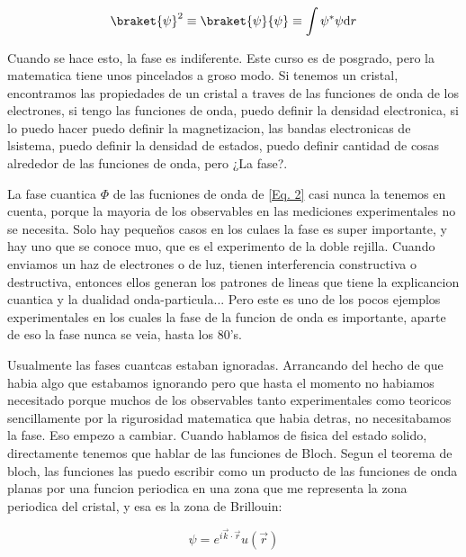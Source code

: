 \documentclass[11pt,fleqn]{book}
\begin{document}
\begin{equation}
    \braket{\psi}^{2}\equiv \braket{\psi}{\psi}\equiv\int\psi^{*}\psi\mathrm{d}r
    \label{Eq. 2}
\end{equation}

Cuando se hace esto, la fase es indiferente. Este curso es de posgrado, pero la matematica tiene unos pincelados a groso modo. Si tenemos un cristal, encontramos las propiedades de un cristal a traves de las funciones de onda de los electrones, si tengo las funciones de onda, puedo definir la densidad electronica, si lo puedo hacer puedo definir la magnetizacion, las bandas electronicas de lsistema, puedo definir la densidad de estados, puedo definir cantidad de cosas alrededor de las funciones de onda, pero ¿La fase?.

La fase cuantica $\Phi$ de las fucniones de onda de \ref{Eq. 2} casi nunca la tenemos en cuenta, porque la mayoria de los observables en las mediciones experimentales no se necesita. Solo hay pequeños casos en los culaes la fase es super importante, y hay uno que se conoce muo, que es el experimento de la doble rejilla. Cuando enviamos un haz de electrones o de luz, tienen interferencia constructiva o destructiva, entonces ellos generan los patrones de lineas que tiene  la explicancion cuantica y la dualidad onda-particula... Pero este es uno de los pocos ejemplos experimentales en los cuales la fase de la funcion de onda es importante, aparte de eso la fase nunca se veia, hasta los 80's. 

Usualmente las fases cuantcas estaban ignoradas. Arrancando del hecho de que habia algo que estabamos ignorando pero que hasta el momento no habiamos necesitado porque muchos de los observables tanto experimentales como teoricos sencillamente por la rigurosidad matematica que habia detras, no necesitabamos la fase. Eso empezo a cambiar. Cuando hablamos de fisica del estado solido, directamente tenemos que hablar de las funciones de Bloch. Segun el teorema de bloch, las funciones las puedo escribir como un producto de las funciones de onda planas por una funcion periodica en una zona que me representa la zona periodica del cristal, y esa es la zona de Brillouin:

\begin{equation}
    \psi=e^{i\vec{k}\cdot\vec{r}}u(\vec{r})
    \label{Eq. 3}
\end{equation}
\end{document}
